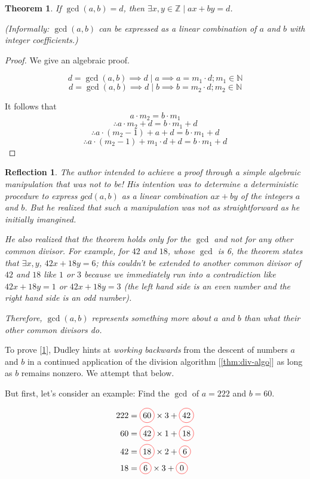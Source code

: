 \documentclass[english,notitlepage,smartquotes]{hgbreport}
\theoremstyle{definition}
\theoremstyle{remark}
\theoremstyle{plain}
\newtheorem{theorem}{Theorem}[chapter]
\renewcommand\qedsymbol{$\blacksquare$}
\newtheorem{reflection}{Reflection}
\newcommand*\circled[1]{\tikz[baseline=(char.base)]{
    \node[shape=circle,draw=red,inner sep=2pt] (char) {#1};}}
\begin{document}
\begin{theorem}
\label{thm:bezout-idty}
If $\gcd(a,b)=d$, then $\exists x,y\in\mathbb{Z}\mid ax+by=d$.

(Informally: $\gcd(a,b)$ can be expressed as a linear combination of $a$ and $b$ with integer coefficients.)
\end{theorem}
\begin{proof}\renewcommand{\qedsymbol}{\textcolor{red}{\Huge\bf ?}}
We give an algebraic proof.

$$
d=\gcd(a,b)\implies d\mid a\implies a=m_1\cdot d; m_1\in\mathbb{N}
$$
$$
d=\gcd(a,b)\implies d\mid b\implies b=m_2\cdot d; m_2\in\mathbb{N}
$$

It follows that
$$
a\cdot m_2=b\cdot m_1
$$
$$
\therefore a\cdot m_2+d=b\cdot m_1+d
$$
$$
\therefore a\cdot (m_2-1)+a+d=b\cdot m_1+d
$$
$$
\therefore a\cdot (m_2-1)+m_1\cdot d+d=b\cdot m_1+d
$$
\end{proof}
\begin{reflection}
The author intended to achieve a proof through a simple algebraic manipulation that was not to be! His intention was to determine a deterministic procedure to express $gcd(a, b)$ as a linear combination $ax+by$ of the integers $a$ and $b$. But he realized that such a manipulation was not as straightforward as he initially imangined. 

He also realized that the theorem holds only for the $\gcd$ and not for any other common divisor. For example, for $42$ and $18$, whose $\gcd$ is 6, the theorem states that $\exists x, y$, $42x+18y=6$; this couldn't be extended to another common divisor of $42$ and $18$ like $1$ or $3$ because we immediately run into a contradiction like $42x+18y=1$ or $42x+18y=3$ (the left hand side is an even number and the right hand side is an odd number).

Therefore, $\gcd(a,b)$ represents something more about $a$ and $b$ than what their other common divisors do.
\end{reflection}

To prove [\ref{thm:bezout-idty}], Dudley hints at \emph{working backwards} from the descent of numbers $a$ and $b$ in a continued application of the division algorithm [\ref{thm:div-algo}] as long as $b$ remains nonzero. We attempt that below.

But first, let's consider an example: Find the $\gcd$ of $a=222$ and $b=60$.

\begin{align*}
222&=\circled{60}\times3+\circled{42}\\
60&=\circled{42}\times1+\circled{18}\\
42&=\circled{18}\times2+\circled{6}\\
18&=\circled{6}\times3+\circled{0}
\end{align*}
\end{document}
